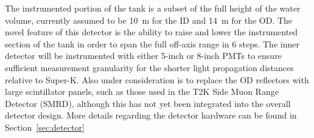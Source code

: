 The instrumented portion of the tank is a subset of the full height of the water volume, currently assumed to be 10~m for the ID and 14~m for the OD. The novel feature of this detector is the ability to raise and lower the instrumented section of the tank in order to span the full off-axis range in 6 steps. The inner detector will be instrumented with either 5-inch or 8-inch PMTs to ensure sufficient measurement granularity for the shorter light propagation distances relative to Super-K. Also under consideration is to replace the OD reflectors with large scintillator panels, such as those used in the T2K Side Muon Range Detector (SMRD), although this has not yet been integrated into the overall detector design. More details regarding the detector hardware can be found in Section~\ref{sec:detector}







